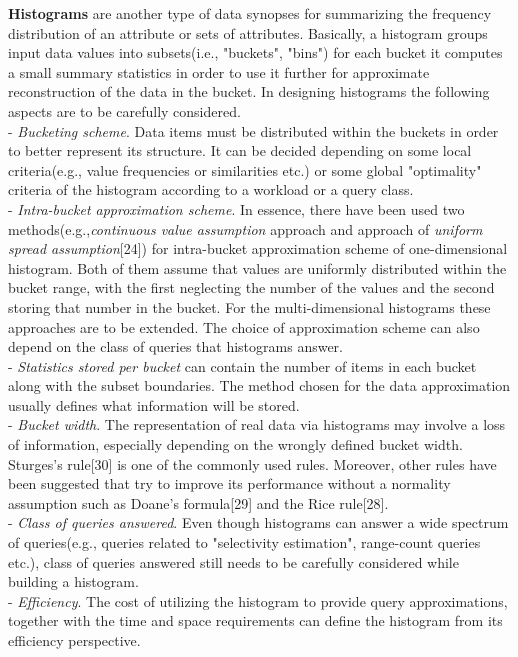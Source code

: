 \documentclass[10pt, conference, compsocconf]{IEEEtran}
\begin{document}
\textbf{Histograms} are another type of data synopses for summarizing the frequency distribution of an attribute or sets of attributes. Basically, a histogram groups input data values into subsets(i.e., "buckets", "bins") for each bucket it computes a small summary statistics in order to use it further for approximate reconstruction of the data in the bucket. In designing histograms the following aspects are to be carefully considered.  \\
- \textit{Bucketing scheme}. Data items must be distributed within the buckets in order to better represent its structure. It can be decided depending on some local criteria(e.g., value frequencies or similarities etc.) or some global "optimality" criteria of the histogram according to a workload or a query class.\\
- \textit{Intra-bucket approximation scheme}. In essence, there have been used two methods(e.g.,\textit{continuous value assumption} approach and  approach of \textit{uniform spread assumption}[24]) for intra-bucket approximation scheme of one-dimensional histogram. Both of them assume that values are uniformly distributed within the bucket range, with the first neglecting the number of the values and the second storing that number in the bucket. For the multi-dimensional histograms these approaches are to be extended. The choice of approximation scheme can also depend on the class of queries that histograms answer.\\
- \textit{Statistics stored per bucket} can contain the number of items in each bucket along with the subset boundaries. The method chosen for the data approximation usually defines what information will be stored.\\
- \textit{Bucket width}. The representation of real data via histograms may involve a loss of information, especially depending on the wrongly defined bucket width. Sturges's rule[30] is one of the commonly used rules. Moreover, other rules have been suggested that try to improve its performance without a normality assumption such as Doane's formula[29] and the Rice rule[28].\\ 
- \textit{Class of queries answered}. Even though histograms can answer a wide spectrum of queries(e.g., queries related to "selectivity estimation", range-count queries etc.), class of queries answered still needs to be carefully considered while building a histogram.\\ 
- \textit{Efficiency}. The cost of utilizing the histogram to provide query approximations, together with the time and space requirements can define the histogram from its efficiency perspective.\\
\end{document}
